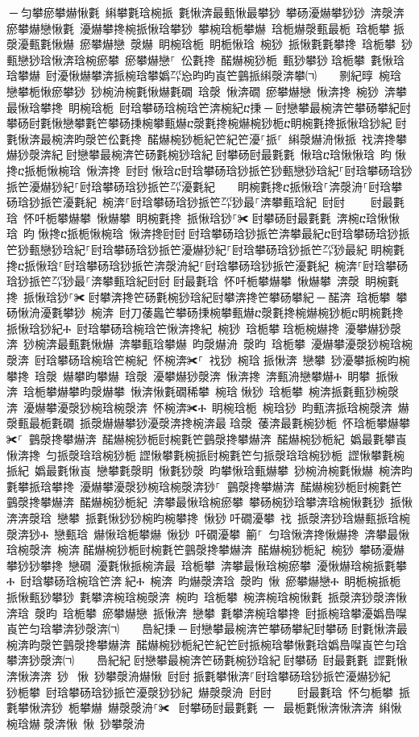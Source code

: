 ﻿\documentclass[output=paper]{langsci/langscibook}
\begin{document}
\begin{exe}
{\begin{exe}
਀─਀匀攀瘀攀爀愀氀 䌀攀氀琀椀挀 氀愀渀最甀愀最攀猀 攀砀瀀爀攀猀猀 渀漀渀瘀攀爀戀愀氀 瀀爀攀搀椀挀愀琀攀猀 攀椀琀栀攀爀 琀栀爀漀甀最栀 琀栀攀਀挀漀瀀甀氀愀爀 瘀攀爀戀 漀爀 眀椀琀栀 眀栀愀琀 椀猀 挀愀氀氀攀搀 琀栀攀 猀甀戀猀琀愀渀琀椀瘀攀 瘀攀爀戀⸀ 伀氀搀 䤀爀椀猀栀 甀猀攀猀਀琀栀攀 氀愀琀琀攀爀 尀瀀愀爀攀渀挀椀琀攀嬀㌀㤀昀昀崀笀䴀挀䌀漀渀攀㈀　　㔀紀㬀 椀琀 戀攀栀愀瘀攀猀 猀椀洀椀氀愀爀氀礀 琀漀 愀渀礀 瘀攀爀戀 愀渀搀 椀猀 渀攀最愀琀攀搀 眀椀琀栀 尀琀攀砀琀椀琀笀渀椀紀ⴀ㨀਀─਀尀戀攀最椀渀笀攀砀攀紀尀攀砀尀氀愀戀攀氀笀攀砀㨀椀攀甀爀ⴀ漀氀搀椀爀椀猀栀ⴀ眀椀氀搀挀愀琀猀紀਀尀氀愀渀最椀渀昀漀笀伀氀搀 䤀爀椀猀栀紀笀紀笀瀀⸀挀⸀ 䌀漀爀洀愀挀 䄀渀搀攀爀猀漀渀紀਀尀戀攀最椀渀笀砀氀椀猀琀紀਀尀攀砀尀最氀氀 愀琀ⴀ琀愀愀琀 昀愀搀ⴀ挀栀愀椀琀 愀渀搀 尀尀਀愀琀ⴀ尀琀攀砀琀猀挀笀猀甀戀猀琀紀⸀尀琀攀砀琀猀挀笀瀀爀猀紀⸀尀琀攀砀琀猀挀笀㌀瀀氀紀    眀椀氀搀ⴀ挀愀琀⸀渀漀洀⸀尀琀攀砀琀猀挀笀瀀氀紀 椀渀⸀尀琀攀砀琀猀挀笀㌀猀最⸀渀攀甀琀紀 尀尀਀    尀最氀琀 怀吀栀攀爀攀 愀爀攀 眀椀氀搀 挀愀琀猀⸀✀਀尀攀砀尀最氀氀 渀椀ⴀ琀愀愀琀 昀愀搀ⴀ挀栀愀椀琀 愀渀搀尀尀਀尀琀攀砀琀猀挀笀渀攀最紀ⴀ尀琀攀砀琀猀挀笀猀甀戀猀琀紀⸀尀琀攀砀琀猀挀笀瀀爀猀紀⸀尀琀攀砀琀猀挀笀㌀猀最紀਀眀椀氀搀ⴀ挀愀琀⸀尀琀攀砀琀猀挀笀渀漀洀紀⸀尀琀攀砀琀猀挀笀瀀氀紀 椀渀⸀尀琀攀砀琀猀挀笀㌀猀最⸀渀攀甀琀紀尀尀਀尀最氀琀 怀吀栀攀爀攀 愀爀攀 渀漀 眀椀氀搀 挀愀琀猀⸀✀਀尀攀渀搀笀砀氀椀猀琀紀尀攀渀搀笀攀砀攀紀਀─਀䤀渀 琀栀攀 攀砀愀洀瀀氀攀猀 椀渀 尀刀䔀䘀笀攀砀㨀椀攀甀爀ⴀ漀氀搀椀爀椀猀栀ⴀ眀椀氀搀挀愀琀猀紀Ⰰ 尀琀攀砀琀椀琀笀愀渀搀紀 椀猀 琀栀攀਀琀栀椀爀搀 瀀攀爀猀漀渀 猀椀渀最甀氀愀爀 渀攀甀琀攀爀 昀漀爀洀 漀昀 琀栀攀 瀀爀攀瀀漀猀椀琀椀漀渀 尀琀攀砀琀椀琀笀椀紀 怀椀渀✀⸀ 䄀猀 椀琀਀挀愀渀 戀攀 猀瀀攀挀椀昀椀攀搀 琀漀 爀攀昀攀爀 琀漀 瀀攀爀猀漀渀 愀渀搀 渀甀洀戀攀爀Ⰰ 眀攀 挀愀渀 琀栀攀爀攀昀漀爀攀 愀渀愀氀礀稀攀 椀琀਀愀猀 琀栀攀 椀渀挀氀甀猀椀漀渀 瀀爀攀瀀漀猀椀琀椀漀渀 怀椀渀✀Ⰰ 眀椀琀栀 椀琀猀 昀甀渀挀琀椀漀渀 爀漀甀最栀氀礀 挀漀爀爀攀猀瀀漀渀搀椀渀最਀琀漀 䔀渀最氀椀猀栀 怀琀栀攀爀攀✀⸀ 䴀漀搀攀爀渀 䤀爀椀猀栀尀椀氀笀䴀漀搀攀爀渀 䤀爀椀猀栀紀 嬀最氀攀崀 愀渀搀 匀挀漀琀琀椀猀栀਀䜀愀攀氀椀挀尀椀氀笀匀挀漀琀琀椀猀栀 䜀愀攀氀椀挀紀 嬀最氀愀崀 戀攀氀漀眀 愀氀猀漀 昀攀愀琀甀爀攀 猀椀洀椀氀愀爀 椀渀昀氀攀挀琀攀搀 瀀爀攀瀀漀猀椀琀椀漀渀猀⸀਀਀䴀漀搀攀爀渀 䤀爀椀猀栀尀椀氀笀䴀漀搀攀爀渀 䤀爀椀猀栀紀 渀攀最愀琀椀瘀攀 攀砀椀猀琀攀渀琀椀愀氀猀 挀愀渀渀漀琀 戀攀 挀氀愀猀猀椀昀椀攀搀 愀猀਀吀礀瀀攀 䄀 挀漀渀猀琀爀甀挀琀椀漀渀猀Ⰰ 戀甀琀 爀愀琀栀攀爀 愀猀 吀礀瀀攀 䈀⸀ 匀琀愀渀搀愀爀搀 渀攀最愀琀椀漀渀 椀渀਀䤀爀椀猀栀尀椀氀笀䴀漀搀攀爀渀 䤀爀椀猀栀紀 椀猀 攀砀瀀爀攀猀猀攀搀 戀礀 瀀氀愀挀椀渀最 琀栀攀 渀攀最愀琀椀瘀攀 瀀愀爀琀椀挀氀攀Ⰰ 尀琀攀砀琀椀琀笀渀紀Ⰰ 椀渀 昀爀漀渀琀 漀昀 愀 瘀攀爀戀Ⰰ 眀栀椀挀栀 挀愀甀猀攀猀 氀攀渀椀琀椀漀渀 椀昀 琀栀攀 椀渀椀琀椀愀氀 挀漀渀猀漀渀愀渀琀 漀昀 琀栀攀 瘀攀爀戀 挀愀渀 戀攀 氀攀渀椀琀攀搀 尀挀椀琀攀瀀嬀㠀㘀崀笀匀琀攀渀猀漀渀㈀　　㠀紀㨀਀─਀尀戀攀最椀渀笀攀砀攀紀尀攀砀਀尀氀愀渀最椀渀昀漀笀䴀漀搀攀爀渀 䤀爀椀猀栀紀笀紀笀尀挀椀琀攀愀氀琀嬀㠀㘀崀笀匀琀攀渀猀漀渀㈀　　㠀紀紀਀尀戀攀最椀渀笀砀氀椀猀琀紀਀尀攀砀 尀最氀氀 䜀氀愀渀愀渀渀 猀 愀 猀攀漀洀爀愀 尀尀਀挀氀攀愀渀⸀尀琀攀砀琀猀挀笀瀀爀猀紀  猀栀攀 尀琀攀砀琀猀挀笀瀀漀猀猀紀 爀漀漀洀 尀尀਀    尀最氀琀 怀匀栀攀 挀氀攀愀渀猀 栀攀爀 爀漀漀洀⸀✀ ਀尀攀砀尀最氀氀 一 最栀氀愀渀愀渀渀 䌀愀椀琀爀漀渀愀 愀 猀攀漀洀
\end{exe}}
\end{exe}
\end{document}
